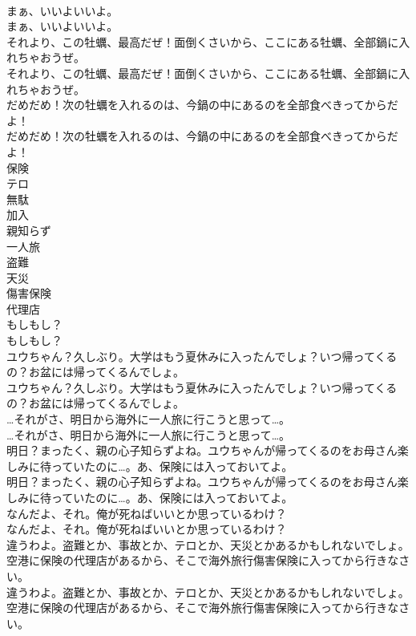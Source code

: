 \documentclass[8pt]{extreport}
\begin{document}
\begin{CJK}{UTF8}{min}
\\	まぁ、いいよいいよ。	
\\	まぁ、いいよいいよ。 
\\	それより、この牡蠣、最高だぜ！面倒くさいから、ここにある牡蠣、全部鍋に入れちゃおうぜ。	
\\	それより、この牡蠣、最高だぜ！面倒くさいから、ここにある牡蠣、全部鍋に入れちゃおうぜ。 
\\	だめだめ！次の牡蠣を入れるのは、今鍋の中にあるのを全部食べきってからだよ！	
\\	だめだめ！次の牡蠣を入れるのは、今鍋の中にあるのを全部食べきってからだよ！ 
\\	保険
\\	テロ
\\	無駄
\\	加入
\\	親知らず
\\	一人旅
\\	盗難
\\	天災
\\	傷害保険
\\	代理店
\\	もしもし？	
\\	もしもし？ 
\\	ユウちゃん？久しぶり。大学はもう夏休みに入ったんでしょ？いつ帰ってくるの？お盆には帰ってくるんでしょ。	
\\	ユウちゃん？久しぶり。大学はもう夏休みに入ったんでしょ？いつ帰ってくるの？お盆には帰ってくるんでしょ。 
\\	…それがさ、明日から海外に一人旅に行こうと思って…。	
\\	…それがさ、明日から海外に一人旅に行こうと思って…。 
\\	明日？まったく、親の心子知らずよね。ユウちゃんが帰ってくるのをお母さん楽しみに待っていたのに…。あ、保険には入っておいてよ。	
\\	明日？まったく、親の心子知らずよね。ユウちゃんが帰ってくるのをお母さん楽しみに待っていたのに…。あ、保険には入っておいてよ。 
\\	なんだよ、それ。俺が死ねばいいとか思っているわけ？	
\\	なんだよ、それ。俺が死ねばいいとか思っているわけ？ 
\\	違うわよ。盗難とか、事故とか、テロとか、天災とかあるかもしれないでしょ。空港に保険の代理店があるから、そこで海外旅行傷害保険に入ってから行きなさい。	
\\	違うわよ。盗難とか、事故とか、テロとか、天災とかあるかもしれないでしょ。空港に保険の代理店があるから、そこで海外旅行傷害保険に入ってから行きなさい。 

\end{CJK}
\end{document}
